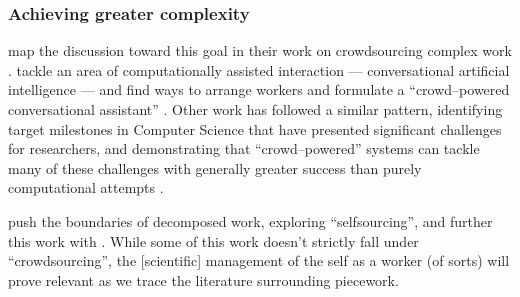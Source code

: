 \documentclass[trackingWork]{subfiles}
\begin{document}
%


\subsubsection{Achieving greater complexity}\label{sec:Complexity}
\citeauthor{crowdForgeKittur}
map the discussion toward this goal in their work on
crowdsourcing complex work
\cite{crowdForgeKittur}.
\citeauthor{Lasecki:2013:CCC:2501988.2502057} tackle an area of computationally assisted interaction
--- conversational artificial intelligence ---
and find ways to arrange workers and formulate a ``crowd--powered conversational assistant''
\cite{Lasecki:2013:CCC:2501988.2502057}.
Other work has followed a similar pattern,
identifying target milestones in Computer Science
that have presented significant challenges for researchers,
and demonstrating that ``crowd--powered'' systems can tackle many of these challenges
with generally greater success than purely computational attempts
\cite[][and others]{Lasecki:2013:RCL:2441776.2441912,foundry}.



\citeauthor{selfsourcingTeevan2014} push the boundaries of decomposed work,
exploring ``selfsourcing'', and further this work with \citeauthor{selfsourcingTeevan2016}
\cite{selfsourcingTeevan2014,selfsourcingTeevan2016}.
While some of this work doesn't strictly fall under ``crowdsourcing'',
the [scientific] management of the self as a worker
(of sorts)
will prove relevant as we trace the literature surrounding piecework.
\end{document}
